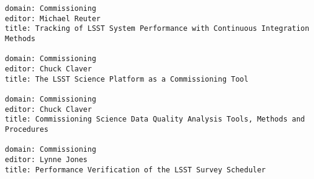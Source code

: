 \begin{verbatim}
domain: Commissioning
editor: Michael Reuter
title: Tracking of LSST System Performance with Continuous Integration Methods

domain: Commissioning
editor: Chuck Claver
title: The LSST Science Platform as a Commissioning Tool

domain: Commissioning
editor: Chuck Claver
title: Commissioning Science Data Quality Analysis Tools, Methods and Procedures

domain: Commissioning
editor: Lynne Jones
title: Performance Verification of the LSST Survey Scheduler


\end{verbatim}
